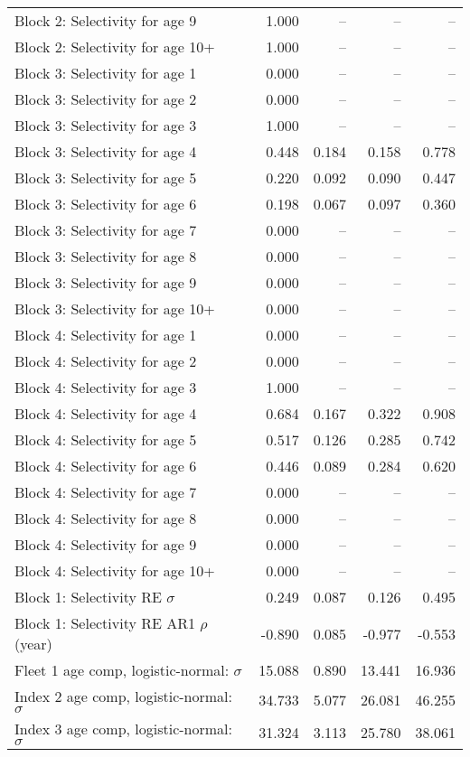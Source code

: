 \documentclass[
]{article}
\begin{document}
\begin{landscape}
\begin{longtable}[t]{lrrrr}
\addlinespace
Block 2: Selectivity for age 9 & 1.000 & -- & -- & --\\
Block 2: Selectivity for age 10+ & 1.000 & -- & -- & --\\
Block 3: Selectivity for age 1 & 0.000 & -- & -- & --\\
Block 3: Selectivity for age 2 & 0.000 & -- & -- & --\\
Block 3: Selectivity for age 3 & 1.000 & -- & -- & --\\
\addlinespace
Block 3: Selectivity for age 4 & 0.448 & 0.184 & 0.158 & 0.778\\
Block 3: Selectivity for age 5 & 0.220 & 0.092 & 0.090 & 0.447\\
Block 3: Selectivity for age 6 & 0.198 & 0.067 & 0.097 & 0.360\\
Block 3: Selectivity for age 7 & 0.000 & -- & -- & --\\
Block 3: Selectivity for age 8 & 0.000 & -- & -- & --\\
\addlinespace
Block 3: Selectivity for age 9 & 0.000 & -- & -- & --\\
Block 3: Selectivity for age 10+ & 0.000 & -- & -- & --\\
Block 4: Selectivity for age 1 & 0.000 & -- & -- & --\\
Block 4: Selectivity for age 2 & 0.000 & -- & -- & --\\
Block 4: Selectivity for age 3 & 1.000 & -- & -- & --\\
\addlinespace
Block 4: Selectivity for age 4 & 0.684 & 0.167 & 0.322 & 0.908\\
Block 4: Selectivity for age 5 & 0.517 & 0.126 & 0.285 & 0.742\\
Block 4: Selectivity for age 6 & 0.446 & 0.089 & 0.284 & 0.620\\
Block 4: Selectivity for age 7 & 0.000 & -- & -- & --\\
Block 4: Selectivity for age 8 & 0.000 & -- & -- & --\\
\addlinespace
Block 4: Selectivity for age 9 & 0.000 & -- & -- & --\\
Block 4: Selectivity for age 10+ & 0.000 & -- & -- & --\\
Block 1: Selectivity RE $\sigma$ & 0.249 & 0.087 & 0.126 & 0.495\\
Block 1: Selectivity RE AR1 $\rho$ (year) & -0.890 & 0.085 & -0.977 & -0.553\\
Fleet 1 age comp, logistic-normal: $\sigma$ & 15.088 & 0.890 & 13.441 & 16.936\\
\addlinespace
Index 2 age comp, logistic-normal: $\sigma$ & 34.733 & 5.077 & 26.081 & 46.255\\
Index 3 age comp, logistic-normal: $\sigma$ & 31.324 & 3.113 & 25.780 & 38.061\\*
\end{longtable}
\end{landscape}
\end{document}
